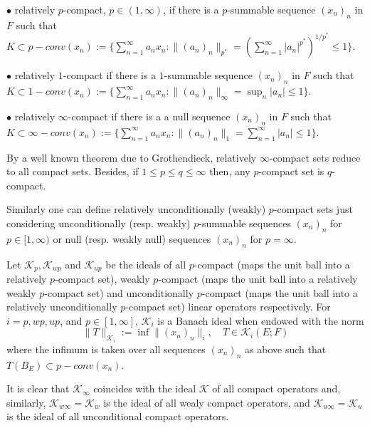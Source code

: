 \documentclass[12pt]{amsart}
\theoremstyle{plain}
\numberwithin{equation}{section}
\begin{document}
\medskip
$\bullet$  relatively $p$-compact, $p\in (1,\infty)$,  if there is a $p$-summable sequence $(x_n)_n$ in $F$   such that $K\subset p-conv(x_n):=\{ \sum_{n=1}^\infty a_nx_n: \|(a_n)_n\|_{p^*}=(\sum_{n=1}^\infty |a_n|^{p^*})^{1/p^*}\leq 1\}$.

\medskip
$\bullet$  relatively $1$-compact if there is a $1$-summable sequence $(x_n)_n$ in $F$   such that $K\subset 1-conv(x_n):=\{ \sum_{n=1}^\infty a_nx_n: \|(a_n)_n\|_{\infty}=\sup_n |a_n|\leq 1\}$.

\medskip
$\bullet$  relatively $\infty$-compact if there is a  a null sequence $(x_n)_n$ in $F$  such that $K\subset \infty-conv(x_n):=\{ \sum_{n=1}^\infty a_nx_n: \|(a_n)_n\|_{1}=\sum_{n=1}^\infty |a_n|\leq 1\}$.

\medskip
By a well known theorem due to Grothendieck, relatively $\infty$-compact sets reduce to all compact sets.  Besides,  if $1\leq p\leq q\leq \infty$ then, any $p$-compact set is $q$-compact.

Similarly one can define relatively unconditionally (weakly) $p$-compact sets   just considering unconditionally (resp. weakly) $p$-summable sequences $(x_n)_n$ for $p\in [1,\infty)$ or   null (resp. weakly null) sequences $(x_n)_n$ for $p=\infty$.

Let $\mathcal K_p, \mathcal K_{wp}$ and $\mathcal K_{up}$ be the ideals of all $p$-compact (maps the unit ball into a relatively $p$-compact set), weakly $p$-compact (maps the unit ball into a relatively weakly $p$-compact set) and unconditionally $p$-compact (maps the unit ball into a relatively unconditionally $p$-compact set) linear operators respectively. For $i=p,wp,up$, and $p\in [1,\infty]$, $\mathcal K_i$ is a Banach ideal when endowed with the norm
$$
\|T\|_{\mathcal K_i}:=\inf \| (x_n)_n\|_{i}, \quad T\in \mathcal K_i(E;F)
$$
where the infimum is taken over all sequences $(x_n)_n$ as above such that $T(B_E)\subset p-conv(x_n)$.

It is clear that $\mathcal K_\infty$ coincides with the ideal $\mathcal K$ of all compact operators   and, similarly, $\mathcal K_{w\infty}=\mathcal K_w$ is the ideal of all wealy compact operators, and $\mathcal K_{u\infty}=\mathcal K_u$ is the ideal of all unconditional compact operators.
\end{document}
